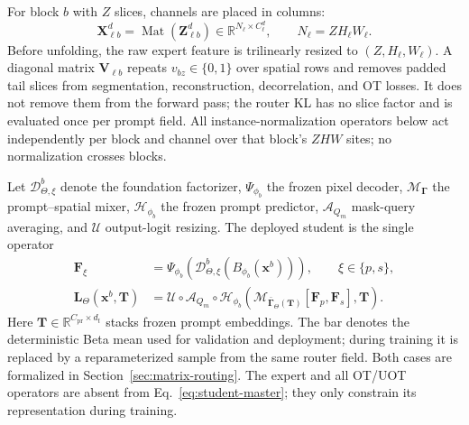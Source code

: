 \documentclass[10pt]{article}
\newcommand{\R}{\mathbb{R}}
\newcommand{\Mat}{\operatorname{Mat}}
\begin{document}
For block $b$ with $Z$ slices, channels are placed in columns:
\begin{equation}
 \bm X_{\ell b}^{d}
 =\Mat(\bm Z_{\ell b}^{d})
 \in\R^{N_\ell\times C_\ell^d},
 \qquad N_\ell=ZH_\ell W_\ell .
 \label{eq:token-convention}
\end{equation}
Before unfolding, the raw expert feature is trilinearly resized to
$(Z,H_\ell,W_\ell)$.  A diagonal matrix
$\bm V_{\ell b}$ repeats $v_{bz}\in\{0,1\}$ over spatial rows and removes padded
tail slices from segmentation, reconstruction, decorrelation, and OT losses.
It does not remove them from the forward pass; the router KL has no slice
factor and is evaluated once per prompt field.
All instance-normalization operators below act independently per block and
channel over that block's $ZHW$ sites; no normalization crosses blocks.

Let $\mathcal D_{\Theta,\xi}^b$ denote the foundation factorizer,
$\Psi_{\phi_b}$ the frozen pixel decoder, $\mathcal M_{\bm\Gamma}$ the
prompt--spatial mixer, $\mathcal H_{\phi_b}$ the frozen prompt predictor,
$\mathcal A_{Q_m}$ mask-query averaging, and $\mathcal U$ output-logit resizing.
The deployed student is the single operator
\begin{equation}
\boxed{
\begin{aligned}
 \bm F_\xi
 &=\Psi_{\phi_b}\!\left(
    \mathcal D_{\Theta,\xi}^b(B_{\phi_b}(\bm x^b))\right),
 \qquad \xi\in\{p,s\},\\
 \bm L_\Theta(\bm x^b,\bm T)
 &=\mathcal U\circ\mathcal A_{Q_m}\circ\mathcal H_{\phi_b}
   \left(
   \mathcal M_{\bar{\bm\Gamma}_\Theta(\bm T)}[\bm F_p,\bm F_s],
   \bm T\right).
\end{aligned}}
\label{eq:student-master}
\end{equation}
Here $\bm T\in\R^{C_{\mathrm{pr}}\times d_t}$ stacks frozen prompt embeddings.
The bar denotes the deterministic Beta mean used for validation and deployment;
during training it is replaced by a reparameterized sample from the same
router field.  Both cases are formalized in
Section~\ref{sec:matrix-routing}.
The expert and all OT/UOT operators are absent from
Eq.~\eqref{eq:student-master}; they only constrain its representation during
training.
\end{document}
